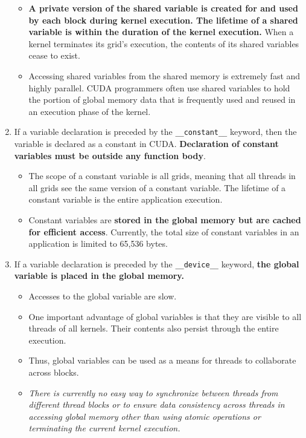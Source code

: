 \begin{enumerate}
\begin{itemize}
                  \item \textbf{A private version of the shared variable is created for and used by each block during kernel execution. The lifetime of a shared variable is within the duration of the kernel execution.} When a kernel terminates its grid's execution, the contents of its shared variables cease to exist.
                  \item Accessing shared variables from the shared memory is extremely fast and highly parallel. CUDA programmers often use shared variables to hold the portion of global memory data that is frequently used and reused in an execution phase of the kernel.
            \end{itemize}
      \item If a variable declaration is preceded by the \texttt{\_\_constant\_\_} keyword, then the variable is declared as a constant in CUDA.\textbf{ Declaration of constant variables must be outside any function body}.
            \begin{itemize}
                  \item The scope of a constant variable is all grids, meaning that all threads in all grids see the same version of a constant variable. The lifetime of a constant variable is the entire application execution.
                  \item Constant variables are \textbf{stored in the global memory but are cached for efficient access}. Currently, the total size of constant variables in an application is limited to 65,536 bytes.
            \end{itemize}
      \item If a variable declaration is preceded by the \texttt{\_\_device\_\_} keyword, \textbf{the global variable is placed in the global memory.}
            \begin{itemize}
                  \item Accesses to the global variable are slow.
                  \item One important advantage of global variables is that they are visible to all threads of all kernels. Their contents also persist through the entire execution.
                  \item Thus, global variables can be used as a means for threads to collaborate across blocks.
                  \item \textsl{There is currently no easy way to synchronize between threads from different thread blocks or to ensure data consistency across threads in accessing global memory other than using atomic operations or terminating the current kernel execution.}

\end{itemize}
\end{enumerate}
